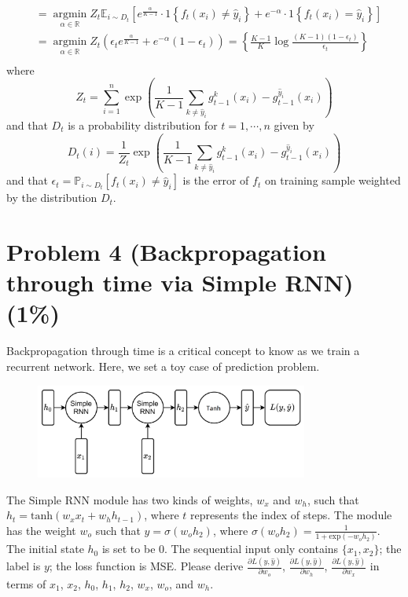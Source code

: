 \documentclass{article}
\begin{document}
{$$\begin{aligned}
& =\underset{\alpha \in \mathbb{R}}{\operatorname{argmin}} Z_t \mathbb{E}_{i \sim D_t}\left[e^{\frac{\alpha}{K-1}} \cdot 1\left\{f_t\left(x_i\right) \neq \hat{y}_i\right\}+e^{-\alpha} \cdot 1\left\{f_t\left(x_i\right)=\hat{y}_i\right\}\right] \\
& =\underset{\alpha \in \mathbb{R}}{\operatorname{argmin}} Z_t\left(\epsilon_t e^{\frac{\alpha}{K-1}}+e^{-\alpha}\left(1-\epsilon_t\right)\right)=\left\{\frac{K-1}{K} \log \frac{(K-1)\left(1-\epsilon_t\right)}{\epsilon_t}\right\} \\
&
\end{aligned}
$$
where $$
Z_t = \sum_{i=1}^n \exp \left(\frac{1}{K-1} \sum_{k \neq \hat{y}_i} g_{t-1}^k\left(x_i\right)-g_{t-1}^{\hat{y}_i}\left(x_i\right)\right) 
$$
and that $D_t$ is a probability distribution for $t =1, \cdots, n$ given by
$$
D_t(i)=\frac{1}{Z_t} \exp \left(\frac{1}{K-1} \sum_{k \neq \hat{y}_i} g_{t-1}^k\left(x_i\right)-g_{t-1}^{\hat{y}_i}\left(x_i\right)\right)
$$
and that $\epsilon_t=\mathbb{P}_{i\sim D_t}\left[f_t\left(x_i\right) \neq \hat{y}_i\right]$ is the error of $f_t$ on training sample weighted by the distribution $D_t$.
}

\section*{Problem 4 (Backpropagation through time via Simple RNN)(1\%)}
Backpropagation through time is a critical concept to know as we train a recurrent network. Here, we set a toy case of prediction problem. 
\begin{figure}[h]
    \centering
    \includegraphics[width=0.8\textwidth]{RNN.png}
\end{figure}
The Simple RNN module has two kinds of weights, $w_x$ and $w_h$, such that $h_t = \text{tanh}(w_xx_t + w_hh_{t-1})$, where $t$ represents the index of steps. The module has the weight $w_o$ such that $\hat{y} = \sigma(w_o h_2)$, where $\sigma(w_oh_2) = \frac{1}{1+\text{exp}(-w_o h_2)}$. The initial state $h_0$ is set to be $0$. The sequential input only contains $\{x_1, x_2\}$; the label is $y$; the loss function is MSE. Please derive $\frac{\partial L(y, \hat{y})}{\partial w_o}$, $\frac{\partial L(y, \hat{y})}{\partial w_h}$, $\frac{\partial L(y, \hat{y})}{\partial w_x}$ in terms of $x_1$, $x_2$, $h_0$, $h_1$, $h_2$, $w_x$, $w_o$, and $w_h$.
\end{document}

